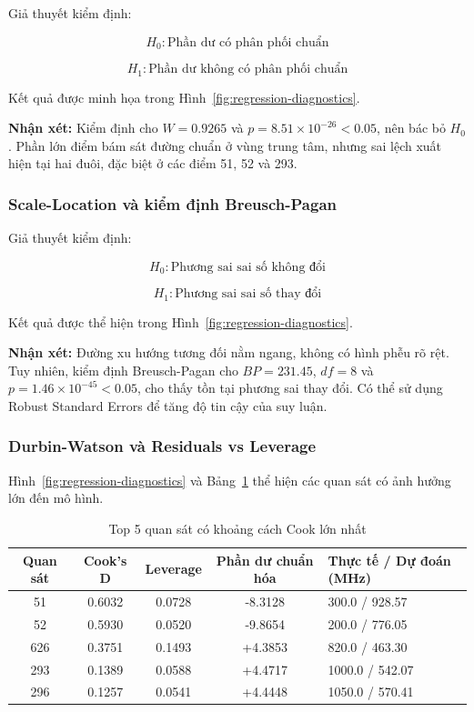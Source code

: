Giả thuyết kiểm định:

\[
H_0:\text{Phần dư có phân phối chuẩn}
\]

\[
H_1:\text{Phần dư không có phân phối chuẩn}
\]

Kết quả được minh họa trong Hình~\ref{fig:regression-diagnostics}.

\textbf{Nhận xét:} Kiểm định cho $W=0.9265$ và $p=8.51\times10^{-26}<0.05$, nên bác bỏ $H_0$. Phần lớn điểm bám sát đường chuẩn ở vùng trung tâm, nhưng sai lệch xuất hiện tại hai đuôi, đặc biệt ở các điểm 51, 52 và 293.

\subsubsection{Scale-Location và kiểm định Breusch-Pagan}

Giả thuyết kiểm định:

\[
H_0:\text{Phương sai sai số không đổi}
\]

\[
H_1:\text{Phương sai sai số thay đổi}
\]

Kết quả được thể hiện trong Hình~\ref{fig:regression-diagnostics}.

\textbf{Nhận xét:} Đường xu hướng tương đối nằm ngang, không có hình phễu rõ rệt. Tuy nhiên, kiểm định Breusch-Pagan cho $BP=231.45$, $df=8$ và $p=1.46\times10^{-45}<0.05$, cho thấy tồn tại phương sai thay đổi. Có thể sử dụng Robust Standard Errors để tăng độ tin cậy của suy luận.

\subsubsection{Durbin-Watson và Residuals vs Leverage}

Hình~\ref{fig:regression-diagnostics} và Bảng~\ref{tab:cooks-distance} thể hiện các quan sát có ảnh hưởng lớn đến mô hình.

\begin{table}[H]
\centering
\scriptsize
\renewcommand{\arraystretch}{1.1}
\setlength{\tabcolsep}{4pt}
\caption{Top 5 quan sát có khoảng cách Cook lớn nhất}
\label{tab:cooks-distance}
\begin{tabularx}{\textwidth}{@{}c c c c X@{}}
\toprule
\textbf{Quan sát} & \textbf{Cook's D} & \textbf{Leverage} & \textbf{Phần dư chuẩn hóa} & \textbf{Thực tế / Dự đoán (MHz)} \\
\midrule
51 & 0.6032 & 0.0728 & -8.3128 & 300.0 / 928.57 \\
52 & 0.5930 & 0.0520 & -9.8654 & 200.0 / 776.05 \\
626 & 0.3751 & 0.1493 & +4.3853 & 820.0 / 463.30 \\
293 & 0.1389 & 0.0588 & +4.4717 & 1000.0 / 542.07 \\
296 & 0.1257 & 0.0541 & +4.4448 & 1050.0 / 570.41 \\
\bottomrule
\end{tabularx}
\end{table}

